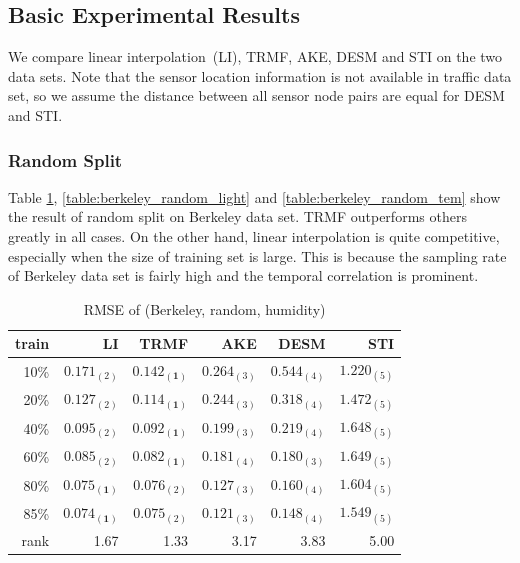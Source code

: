 \subsection{Basic Experimental Results} %
We compare linear interpolation~(LI), TRMF, AKE, DESM and STI on the two data sets. Note that the sensor location information is not available in traffic data set, so we assume the distance between all sensor node pairs are equal for DESM and STI.

\subsubsection{Random Split}
Table \ref{table:berkeley_random_hum}, \ref{table:berkeley_random_light} and \ref{table:berkeley_random_tem} show the result of random split on Berkeley data set. TRMF outperforms others greatly in all cases. On the other hand, linear interpolation is quite competitive, especially when the size of training set is large. This is because the sampling rate of Berkeley data set is fairly high and the temporal correlation is prominent. 

\begin{table}[htbp]
\centering
\caption{RMSE of (Berkeley, random, humidity)}
\label{table:berkeley_random_hum}
\begin{tabular}{ r | r r r r r}
	train	&LI	&TRMF	&AKE	&DESM	&STI\\ \hline
	10\% & $ 0.171_{(2)} $ & $ \mathbf{ 0.142_{(1)} } $ & $ 0.264_{(3)} $ & $ 0.544_{(4)} $ & $ 1.220_{(5)} $ \\
	20\% & $ 0.127_{(2)} $ & $ \mathbf{ 0.114_{(1)} } $ & $ 0.244_{(3)} $ & $ 0.318_{(4)} $ & $ 1.472_{(5)} $ \\
	40\% & $ 0.095_{(2)} $ & $ \mathbf{ 0.092_{(1)} } $ & $ 0.199_{(3)} $ & $ 0.219_{(4)} $ & $ 1.648_{(5)} $ \\
	60\% & $ 0.085_{(2)} $ & $ \mathbf{ 0.082_{(1)} } $ & $ 0.181_{(4)} $ & $ 0.180_{(3)} $ & $ 1.649_{(5)} $ \\
	80\% & $ \mathbf{ 0.075_{(1)} } $ & $ 0.076_{(2)} $ & $ 0.127_{(3)} $ & $ 0.160_{(4)} $ & $ 1.604_{(5)} $ \\
	85\% & $ \mathbf{ 0.074_{(1)} } $ & $ 0.075_{(2)} $ & $ 0.121_{(3)} $ & $ 0.148_{(4)} $ & $ 1.549_{(5)} $ \\ \hline
	rank &1.67 &1.33 &3.17 &3.83 &5.00 \\
\end{tabular}
\end{table}

